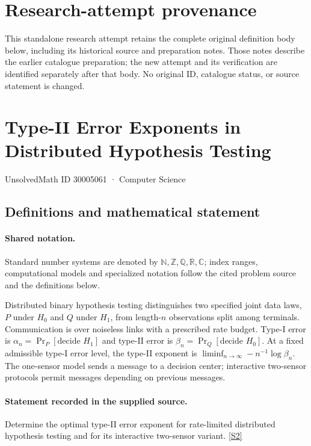 \documentclass[11pt]{article}
\begin{document}
\section*{Research-attempt provenance}
This standalone research attempt retains the complete original definition body below,
including its historical source and preparation notes. Those notes describe the
earlier catalogue preparation; the new attempt and its verification are identified
separately after that body. No original ID, catalogue status, or source statement is changed.

\section{Type-II Error Exponents in Distributed Hypothesis Testing}\label{30005061}
{\small UnsolvedMath ID 30005061 · Computer Science}
\subsection{Definitions and mathematical statement}

\paragraph{Shared notation.}Standard number systems are denoted by $\mathbb N,\mathbb Z,\mathbb Q,\mathbb R,\mathbb C$; index ranges, computational models and specialized notation follow the cited problem source and the definitions below.


Distributed binary hypothesis testing distinguishes two specified joint data laws, $P$ under $H_0$ and $Q$ under $H_1$, from length-$n$ observations split among terminals. Communication is over noiseless links with a prescribed rate budget. Type-I error is $\alpha_n=\Pr_P[\text{decide }H_1]$ and type-II error is $\beta_n=\Pr_Q[\text{decide }H_0]$. At a fixed admissible type-I error level, the type-II exponent is $\liminf_{n\to\infty}-n^{-1}\log\beta_n$. The one-sensor model sends a message to a decision center; interactive two-sensor protocols permit messages depending on previous messages.
\paragraph{Statement recorded in the supplied source.}
Determine the optimal type-II error exponent for rate-limited distributed hypothesis testing and for its interactive two-sensor variant. \href{https://doi.org/10.4171/owr/2022/14}{[S2]}
\end{document}
